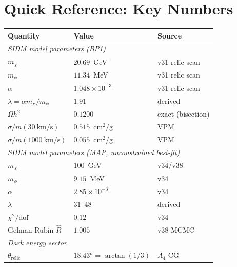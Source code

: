 \documentclass[12pt, a4paper]{article}
\begin{document}
\section{Quick Reference: Key Numbers}

\begin{center}
\begin{tabular}{lll}
  \toprule
  Quantity & Value & Source \\
  \midrule
  \multicolumn{3}{l}{\textit{SIDM model parameters (BP1)}} \\
  \hspace{1em}$m_\chi$ & $20.69$~GeV & v31 relic scan \\
  \hspace{1em}$m_\phi$ & $11.34$~MeV & v31 relic scan \\
  \hspace{1em}$\alpha$ & $1.048 \times 10^{-3}$ & v31 relic scan \\
  \hspace{1em}$\lambda = \alpha m_\chi / m_\phi$ & $1.91$ & derived \\
  \hspace{1em}$\Omega h^2$ & $0.1200$ & exact (bisection) \\
  \hspace{1em}$\sigma/m(30~\text{km/s})$ & $0.515$~cm$^2$/g & VPM \\
  \hspace{1em}$\sigma/m(1000~\text{km/s})$ & $0.055$~cm$^2$/g & VPM \\
  \midrule
  \multicolumn{3}{l}{\textit{SIDM model parameters (MAP, unconstrained best-fit)}} \\
  \hspace{1em}$m_\chi$ & $100$~GeV & v34/v38 \\
  \hspace{1em}$m_\phi$ & $9.15$~MeV & v34 \\
  \hspace{1em}$\alpha$ & $2.85 \times 10^{-3}$ & v34 \\
  \hspace{1em}$\lambda$ & $31$--$48$ & derived \\
  \hspace{1em}$\chi^2/\text{dof}$ & $0.12$ & v34 \\
  \hspace{1em}Gelman-Rubin $\hat R$ & $1.005$ & v38 MCMC \\
  \midrule
  \multicolumn{3}{l}{\textit{Dark energy sector}} \\
  \hspace{1em}$\theta_\text{relic}$ & $18.43°$ = $\arctan(1/3)$ & $A_4$ CG \\

\end{tabular}
\end{center}
\end{document}
